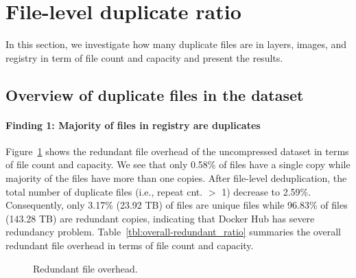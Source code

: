 \section{File-level duplicate ratio}
\label{sec:dedup}

In this section, we investigate how many duplicate files are in layers, images, and registry in term of file count and capacity and present the results.

\subsection{Overview of duplicate files in the dataset}
\paragraph{Finding 1: Majority of files in registry are duplicates}
Figure~\ref{fig:over-dup-overhead} shows the redundant file overhead of the uncompressed dataset in terms of file count and capacity. We see that only 0.58\% of files have a single copy while majority of the files have more than one copies. After file-level deduplication, the total number of duplicate files (i.e., repeat cnt. $>$ 1) decrease to 2.59\%. Consequently, only 3.17\% (23.92 TB) of files are unique files while 96.83\% of files (143.28 TB) are redundant copies, indicating that Docker Hub has severe redundancy problem. Table~\ref{tbl:overall-redundant_ratio} summaries the overall redundant file overhead in terms of file count and capacity.

\begin{figure}
	\centering
	\caption{Redundant file overhead.}
	\label{fig:over-dup-overhead}
\end{figure}

